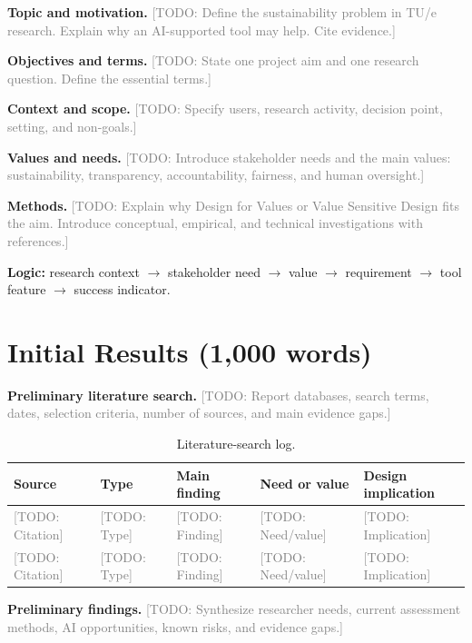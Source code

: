 \documentclass[11pt,a4paper]{article}
\newcommand{\placeholder}[1]{\textcolor{gray}{[TODO: #1]}}
\begin{document}
\textbf{Topic and motivation.}
\placeholder{Define the sustainability problem in TU/e research. Explain why an AI-supported tool may help. Cite evidence.}

\textbf{Objectives and terms.}
\placeholder{State one project aim and one research question. Define the essential terms.}

\textbf{Context and scope.}
\placeholder{Specify users, research activity, decision point, setting, and non-goals.}

\textbf{Values and needs.}
\placeholder{Introduce stakeholder needs and the main values: sustainability, transparency, accountability, fairness, and human oversight.}

\textbf{Methods.}
\placeholder{Explain why Design for Values or Value Sensitive Design fits the aim. Introduce conceptual, empirical, and technical investigations with references.}

\textbf{Logic:} research context $\rightarrow$ stakeholder need $\rightarrow$ value $\rightarrow$ requirement $\rightarrow$ tool feature $\rightarrow$ success indicator.

\section{Initial Results (1,000 words)}

\textbf{Preliminary literature search.}
\placeholder{Report databases, search terms, dates, selection criteria, number of sources, and main evidence gaps.}

\begin{table}[htbp]
\centering
\caption{Literature-search log.}
\small
\begin{tabularx}{\textwidth}{@{}p{}p{}XXp{}@{}}
\toprule
Source & Type & Main finding & Need or value & Design implication \\
\midrule
\placeholder{Citation} & \placeholder{Type} & \placeholder{Finding} & \placeholder{Need/value} & \placeholder{Implication} \\
\placeholder{Citation} & \placeholder{Type} & \placeholder{Finding} & \placeholder{Need/value} & \placeholder{Implication} \\
\bottomrule
\end{tabularx}
\end{table}

\textbf{Preliminary findings.}
\placeholder{Synthesize researcher needs, current assessment methods, AI opportunities, known risks, and evidence gaps.}
\end{document}
